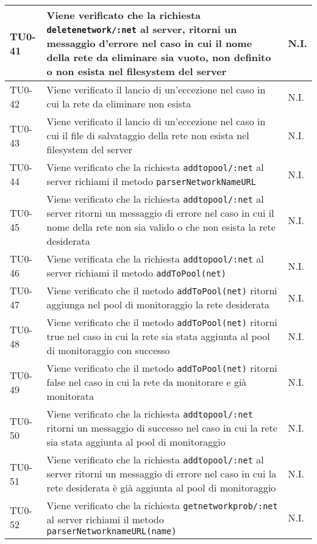 \begin{longtable}{|C{.15\textwidth}|m{.65\textwidth}|C{.20\textwidth}|}
 \hline
 TU0-41 & Viene verificato che la richiesta \texttt{deletenetwork/:net} al server, ritorni un messaggio d'errore nel caso in cui il nome della rete da eliminare sia vuoto,  non definito o non esista nel filesystem del server & N.I. \\ 
 \hline
{}TU0-42 & Viene verificato il lancio di un'eccezione nel caso in cui la rete da eliminare non esista & N.I. \\ 
\hline
 TU0-43 & Viene verificato il lancio di un'eccezione nel caso in cui il file di salvataggio della rete non esista nel filesystem del server & N.I. \\ 
 \hline
  TU0-44 & Viene verificato che la richiesta \texttt{addtopool/:net} al server richiami il metodo \texttt{parserNetworkNameURL} & N.I. \\ 
 \hline
 TU0-45 & Viene verificato che la richiesta \texttt{addtopool/:net} al server ritorni un messaggio di errore nel caso in cui il nome della rete non sia valido o che non esista la rete desiderata & N.I. \\ 
 \hline
 TU0-46 & Viene verificata che la richiesta \texttt{addtopool/:net} al server richiami il metodo \texttt{addToPool(net)} & N.I. \\ 
 \hline
 TU0-47 & Viene verificato che il metodo \texttt{addToPool(net)} ritorni aggiunga nel pool di monitoraggio la rete desiderata & N.I. \\
\hline
{} TU0-48 & Viene verificato che il metodo \texttt{addToPool(net)} ritorni true nel caso in cui la rete sia stata aggiunta al pool di monitoraggio con successo & N.I. \\ 
\hline 
TU0-49 & Viene verificato che il metodo \texttt{addToPool(net)} ritorni false nel caso in cui la rete da monitorare e già monitorata & N.I. \\ 
\hline
{} TU0-50 & Viene verificato che la richiesta \texttt{addtopool/:net} ritorni un messaggio di successo nel caso in cui la rete sia stata aggiunta al pool di monitoraggio & N.I. \\ 
\hline 
TU0-51 & Viene verificato che la richiesta \texttt{addtopool/:net} al server ritorni un messaggio di errore nel caso in cui la rete desiderata è già aggiunta al pool di monitoraggio & N.I. \\ 
\hline 
{} TU0-52 & Viene verificato che la richiesta \texttt{getnetworkprob/:net} al server richiami il metodo \texttt{parserNetworknameURL(name)} &  N.I. \\ 

\end{longtable}

